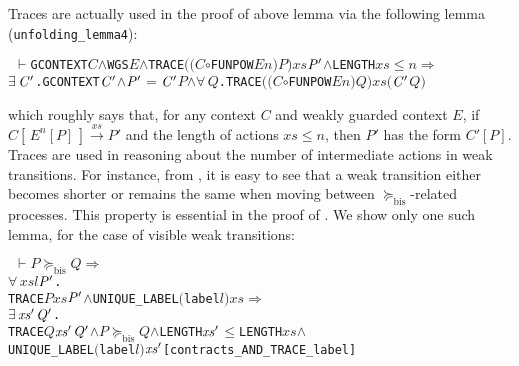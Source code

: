 \documentclass[GCNS]{yincog}
\renewcommand{\HOLConst}[1]{\texttt{#1}}
\renewcommand{\HOLBoundVar}[1]{\ensuremath{\mathit{#1}}}
\renewcommand{\HOLFreeVar}[1]{\ensuremath{\mathit{#1}}}
\renewcommand{\HOLSymConst}[1]{#1}
\renewcommand{\HOLTokenConj}{\ensuremath{\wedge}}
\renewcommand{\HOLTokenLeq}{\ensuremath{\leq}}
\renewcommand{\HOLTokenExists}{\ensuremath{\exists \,}}
\renewcommand{\HOLTokenForall}{\ensuremath{\forall \,}}
\renewcommand{\HOLTokenTurnstile}{\ensuremath{\:\:\vdash}}
\renewcommand{\HOLTokenCompose}{\ensuremath{\circ}}
\theoremstyle{remark}
\theoremstyle{theorem}
\theoremstyle{remark}
\newcommand{\HOLTokenContracts}{$\succeq_{\mathrm{bis}}\!$}
\renewcommand{\HOLTokenImp}{\ensuremath{\Longrightarrow}}
\newcommand{\mcontrBIS}{\mathrel{\succeq_{\mathrm{bis}}}}
\begin{document}
Traces are actually used in the proof of above lemma via the following
lemma (\texttt{unfolding\_lemma4}):
%
\begin{alltt}
\HOLTokenTurnstile{} \HOLConst{GCONTEXT} \HOLFreeVar{C} \HOLSymConst{\HOLTokenConj{}} \HOLConst{WGS} \HOLFreeVar{E} \HOLSymConst{\HOLTokenConj{}} \HOLConst{TRACE} \ensuremath{(}\ensuremath{(}\HOLFreeVar{C} \HOLSymConst{\HOLTokenCompose} \HOLConst{FUNPOW} \HOLFreeVar{E} \HOLFreeVar{n}\ensuremath{)} \HOLFreeVar{P}\ensuremath{)} \HOLFreeVar{xs} \ensuremath{\HOLFreeVar{P}\sp{\prime}} \HOLSymConst{\HOLTokenConj{}} \HOLConst{LENGTH} \HOLFreeVar{xs} \HOLSymConst{\HOLTokenLeq{}} \HOLFreeVar{n} \HOLSymConst{\HOLTokenImp{}}
   \HOLSymConst{\HOLTokenExists{}}\ensuremath{\HOLBoundVar{C}\sp{\prime}}. \HOLConst{GCONTEXT} \ensuremath{\HOLBoundVar{C}\sp{\prime}} \HOLSymConst{\HOLTokenConj{}} \ensuremath{\HOLFreeVar{P}\sp{\prime}} \HOLSymConst{\ensuremath{=}} \ensuremath{\HOLBoundVar{C}\sp{\prime}} \HOLFreeVar{P} \HOLSymConst{\HOLTokenConj{}} \HOLSymConst{\HOLTokenForall{}}\HOLBoundVar{Q}. \HOLConst{TRACE} \ensuremath{(}\ensuremath{(}\HOLFreeVar{C} \HOLSymConst{\HOLTokenCompose} \HOLConst{FUNPOW} \HOLFreeVar{E} \HOLFreeVar{n}\ensuremath{)} \HOLBoundVar{Q}\ensuremath{)} \HOLFreeVar{xs} \ensuremath{(}\ensuremath{\HOLBoundVar{C}\sp{\prime}} \HOLBoundVar{Q}\ensuremath{)}
\end{alltt}
%
which roughly says that, for any context $C$ and weakly guarded context
$E$, if $C [\, E^{n}[P]\,] \overset{xs}{\longrightarrow} P'$ and the length
of actions $xs \leqslant n$, then $P'$ has the form $C'[P]$. Traces are
used in reasoning about the number of intermediate actions in weak transitions.
For instance, from , it is easy to see that a weak transition
either becomes shorter or remains the same when moving between
$\mcontrBIS $-related processes. This property is essential in the proof
of . We show only one such lemma, for the case of
visible weak transitions:
%
\begin{alltt}
\HOLTokenTurnstile{} \HOLFreeVar{P} \HOLSymConst{\HOLTokenContracts{}} \HOLFreeVar{Q} \HOLSymConst{\HOLTokenImp{}}
   \HOLSymConst{\HOLTokenForall{}}\HOLBoundVar{xs} \HOLBoundVar{l} \ensuremath{\HOLBoundVar{P}\sp{\prime}}.
       \HOLConst{TRACE} \HOLFreeVar{P} \HOLBoundVar{xs} \ensuremath{\HOLBoundVar{P}\sp{\prime}} \HOLSymConst{\HOLTokenConj{}} \HOLConst{UNIQUE\_LABEL} \ensuremath{(}\HOLConst{label} \HOLBoundVar{l}\ensuremath{)} \HOLBoundVar{xs} \HOLSymConst{\HOLTokenImp{}}
       \HOLSymConst{\HOLTokenExists{}}\ensuremath{\HOLBoundVar{xs}\sp{\prime}} \ensuremath{\HOLBoundVar{Q}\sp{\prime}}.
           \HOLConst{TRACE} \HOLFreeVar{Q} \ensuremath{\HOLBoundVar{xs}\sp{\prime}} \ensuremath{\HOLBoundVar{Q}\sp{\prime}} \HOLSymConst{\HOLTokenConj{}} \HOLFreeVar{P} \HOLSymConst{\HOLTokenContracts{}} \HOLFreeVar{Q} \HOLSymConst{\HOLTokenConj{}} \HOLConst{LENGTH} \ensuremath{\HOLBoundVar{xs}\sp{\prime}} \HOLSymConst{\HOLTokenLeq{}} \HOLConst{LENGTH} \HOLBoundVar{xs} \HOLSymConst{\HOLTokenConj{}}
           \HOLConst{UNIQUE\_LABEL} \ensuremath{(}\HOLConst{label} \HOLBoundVar{l}\ensuremath{)} \ensuremath{\HOLBoundVar{xs}\sp{\prime}}\hfill{[contracts\_AND\_TRACE\_label]}
\end{alltt}
\end{document}
